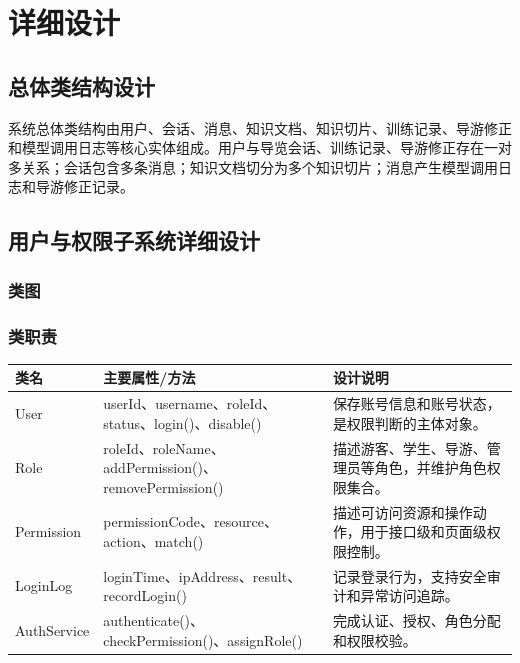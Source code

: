 \section{详细设计}

\subsection{总体类结构设计}

系统总体类结构由用户、会话、消息、知识文档、知识切片、训练记录、导游修正和模型调用日志等核心实体组成。用户与导览会话、训练记录、导游修正存在一对多关系；会话包含多条消息；知识文档切分为多个知识切片；消息产生模型调用日志和导游修正记录。


\subsection{用户与权限子系统详细设计}

\subsubsection{类图}


\subsubsection{类职责}

\begin{longtable}{p{3cm}p{4.2cm}p{6cm}}
\toprule
类名 & 主要属性/方法 & 设计说明 \\
\midrule
User & userId、username、roleId、status、login()、disable() & 保存账号信息和账号状态，是权限判断的主体对象。 \\
Role & roleId、roleName、addPermission()、removePermission() & 描述游客、学生、导游、管理员等角色，并维护角色权限集合。 \\
Permission & permissionCode、resource、action、match() & 描述可访问资源和操作动作，用于接口级和页面级权限控制。 \\
LoginLog & loginTime、ipAddress、result、recordLogin() & 记录登录行为，支持安全审计和异常访问追踪。 \\
AuthService & authenticate()、checkPermission()、assignRole() & 完成认证、授权、角色分配和权限校验。 \\
\bottomrule
\end{longtable}

